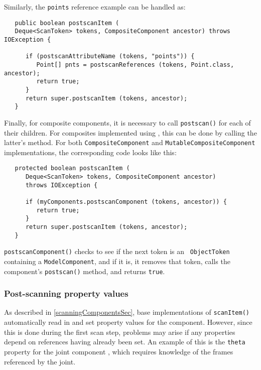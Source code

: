 \documentclass{article}
\begin{document}
Similarly, the {\tt points} reference example can be handled as:
\begin{lstlisting}
   public boolean postscanItem (
   Deque<ScanToken> tokens, CompositeComponent ancestor) throws IOException {

      if (postscanAttributeName (tokens, "points")) {
         Point[] pnts = postscanReferences (tokens, Point.class, ancestor);
         return true;
      }
      return super.postscanItem (tokens, ancestor);
   }
\end{lstlisting}

Finally, for composite components, it is necessary to call {\tt postscan()} for
each of their children. For composites implemented using
,
this can be done by calling the latter's
method. For both 
{\tt CompositeComponent} and {\tt MutableCompositeComponent}
implementations, the corresponding code looks like this:
\begin{lstlisting}
   protected boolean postscanItem (
      Deque<ScanToken> tokens, CompositeComponent ancestor) 
      throws IOException {
      
      if (myComponents.postscanComponent (tokens, ancestor)) {
         return true;
      }
      return super.postscanItem (tokens, ancestor);
   }
\end{lstlisting}
{\tt postscanComponent()} checks to see if the next token is an {\tt
ObjectToken} containing a {\tt ModelComponent}, and if it is, it
removes that token, calls the component's {\tt postscan()} method, and
returns {\tt true}.

\subsubsection{Post-scanning property values}

As described in \ref{scanningComponentsSec}, base implementations of
{\tt scanItem()} automatically read in and set property values for the
component. However, since this is done during the first scan step,
problems may arise if any properties depend on references having
already been set. An example of this is the {\tt theta} property for
the joint component
, which requires
knowledge of the frames referenced by the joint.
\end{document}
